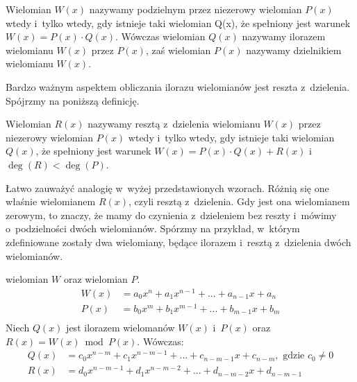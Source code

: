 \begin{definition}
	$ $\\
	Wielomian $W(x)$ nazywamy podzielnym przez niezerowy wielomian $P(x)$ wtedy i~tylko wtedy, gdy istnieje taki wielomian Q(x), że spełniony jest warunek $W(x) = P(x) \cdot Q(x)$. Wówczas wielomian $Q(x)$ nazywamy ilorazem wielomianu $W(x)$ przez $P(x)$, zaś wielomian $P(x)$ nazywamy dzielnikiem wielomianu $W(x)$.
\end{definition}

Bardzo ważnym aspektem obliczania ilorazu wielomianów jest reszta z~dzielenia. Spójrzmy na poniższą definicję.

\begin{definition}
	$ $\\
	Wielomian $R(x)$ nazywamy resztą z~dzielenia wielomianu $W(x)$ przez niezerowy wielomian $P(x)$ wtedy i~tylko wtedy, gdy istnieje taki wielomian $Q(x)$, że spełniony jest warunek $W(x) = P(x) \cdot Q(x) + R(x)$ i~$\deg(R) < \deg(P)$.
\end{definition}

Łatwo zauważyć analogię w~wyżej przedstawionych wzorach. Różnią się one właśnie wielomianem $R(x)$, czyli resztą z~dzielenia. Gdy jest ona wielomianem zerowym, to znaczy, że mamy do czynienia z~dzieleniem bez reszty i~mówimy o~podzielności dwóch wielomianów. Spórzmy na przykład, w~którym zdefiniowane zostały dwa wielomiany, będące ilorazem i~resztą z~dzielenia dwóch wielomianów.

\begin{example}
	$ $\\
	wielomian $W$ oraz wielomian $P$. \\
	\begin{equation*}
		\begin{split}
		W(x) &= a_0x^n + a_1x^{n-1} + ... + a_{n-1}x + a_n \\
		P(x) &= b_0x^m + b_1x^{m-1} + ... + b_{m-1}x + b_m \\
		\end{split}
	\end{equation*}
	Niech $Q(x)$ jest ilorazem wielomanów $W(x)$ i~$P(x)$ oraz $R(x) = W(x)\bmod P(x)$. Wówczas: \\
	\begin{equation*}
		\begin{split}
		Q(x) &= c_0x^{n-m} + c_1x^{n-m-1} + ... + c_{n-m-1}x + c_{n-m},\text{ gdzie }c_0\ne 0 \\
		R(x) &= d_0x^{n-m-1} + d_1x^{n-m-2} + ... + d_{n-m-2}x + d_{n-m-1} \\
		\end{split}
	\end{equation*}
\end{example}

